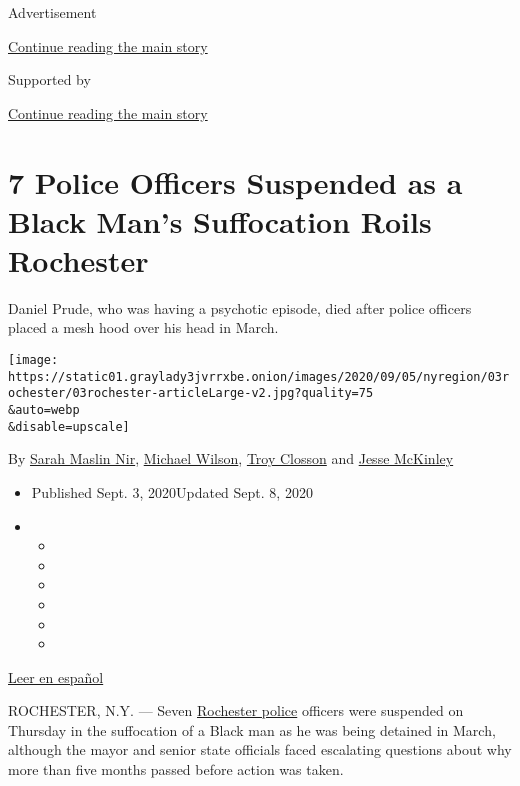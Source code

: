 Advertisement

\protect\hyperlink{after-top}{Continue reading the main story}

Supported by

\protect\hyperlink{after-sponsor}{Continue reading the main story}

\hypertarget{7-police-officers-suspended-as-a-black-mans-suffocation-roils-rochester}{%
\section{7 Police Officers Suspended as a Black Man's Suffocation Roils
Rochester}\label{7-police-officers-suspended-as-a-black-mans-suffocation-roils-rochester}}

Daniel Prude, who was having a psychotic episode, died after police
officers placed a mesh hood over his head in March.

\texttt{[image: https://static01.graylady3jvrrxbe.onion/images/2020/09/05/nyregion/03rochester/03rochester-articleLarge-v2.jpg?quality=75\\\&auto=webp\\\&disable=upscale]}

By \href{https://www.nytimes3xbfgragh.onion/by/sarah-maslin-nir}{Sarah
Maslin Nir},
\href{https://www.nytimes3xbfgragh.onion/by/michael-wilson}{Michael
Wilson}, \href{https://www.nytimes3xbfgragh.onion/by/troy-closson}{Troy
Closson} and
\href{https://www.nytimes3xbfgragh.onion/by/jesse-mckinley}{Jesse
McKinley}

\begin{itemize}
\item
  Published Sept. 3, 2020Updated Sept. 8, 2020
\item
  \begin{itemize}
  \item
  \item
  \item
  \item
  \item
  \item
  \end{itemize}
\end{itemize}

\href{https://www.nytimes3xbfgragh.onion/es/2020/09/04/espanol/estados-unidos/daniel-prude-rochester-policia.html}{Leer
en español}

ROCHESTER, N.Y. --- Seven
\href{https://www.nytimes3xbfgragh.onion/2020/09/08/nyregion/rochester-police-chief-resigns-prude.html}{Rochester
police} officers were suspended on Thursday in the suffocation of a
Black man as he was being detained in March, although the mayor and
senior state officials faced escalating questions about why more than
five months passed before action was taken.

